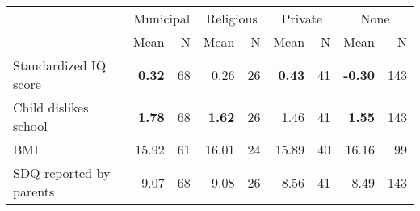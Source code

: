 \begin{tabular}{l r r r r r r r r}
\toprule
& \multicolumn{2}{c}{Municipal} & \multicolumn{2}{c}{Religious} & \multicolumn{2}{c}{Private} & \multicolumn{2}{c}{None} \\
& \scriptsize Mean & \scriptsize N & \scriptsize Mean & \scriptsize N & \scriptsize Mean & \scriptsize N & \scriptsize Mean & \scriptsize N \\
\midrule
Standardized IQ score & \textbf{     0.32} &        68 &      0.26 &        26 & \textbf{     0.43} &        41 & \textbf{    -0.30} &       143 \\
Child dislikes school & \textbf{     1.78} &        68 & \textbf{     1.62} &        26 &      1.46 &        41 & \textbf{     1.55} &       143 \\
BMI &     15.92 &        61 &     16.01 &        24 &     15.89 &        40 &     16.16 &        99 \\
SDQ reported by parents &      9.07 &        68 &      9.08 &        26 &      8.56 &        41 &      8.49 &       143 \\
\bottomrule
\end{tabular}
